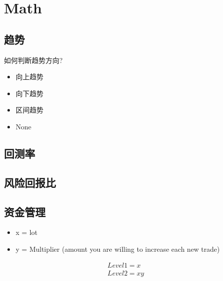 \chapter{Math}

\section{趋势}

如何判断趋势方向?

\begin{itemize}
\item 向上趋势
\item 向下趋势
\item 区间趋势
\item None
\end{itemize}

\section{回测率}


\section{风险回报比}

\section{资金管理}

\begin{itemize}
\item x = lot 
\item y = Multiplier (amount you are willing to increase each new trade)
\end{itemize}


\begin{align}
Level1=x &\\
Level2=xy &\\	
\end{align}















